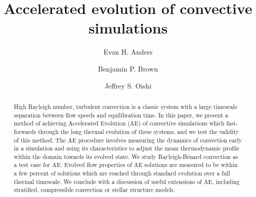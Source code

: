 \documentclass[aps, pre, onecolumn, nofootinbib, notitlepage, groupedaddress, amsfonts, amssymb, amsmath, longbibliography]{revtex4-1}
\newcommand{\RB}{Rayleigh-B\'{e}nard }
\begin{document}
\author{Evan H. Anders}
\author{Benjamin P. Brown}
\author{Jeffrey S. Oishi}
\title{Accelerated evolution of convective simulations}

\begin{abstract}
High Rayleigh number, turbulent convection is a classic system with a large timescale
separation between flow speeds and equilibration time.
In this paper, we present a method of achieving Accelerated Evolution (AE) of convective simulations which
fast-forwards through the long thermal evolution of these systems, and we test the
validity of this method. The AE procedure involves measuring the dynamics of convection
early in a simulation and using its characteristics to adjust the mean thermodynamic
profile within the domain towards its evolved state. We study \RB convection as a test case for AE.  
Evolved flow properties of AE solutions are measured to be within a few percent
of solutions which are reached through standard evolution over a full thermal timescale. 
We conclude with a discussion of useful extensions of AE, including 
stratified, compressible convection or stellar structure models.
\end{abstract}
\maketitle

\end{document}

